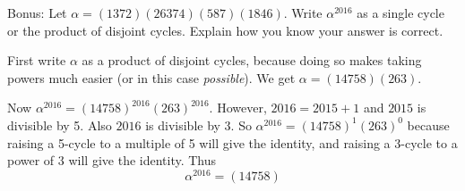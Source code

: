 \documentclass[11pt]{exam}
\begin{document}
\begin{questions}
\bonusquestion[5] Bonus: Let $\alpha = (1372)(26374)(587)(1846)$.  Write $\alpha^{2016}$ as a single cycle or the product of disjoint cycles. Explain how you know your answer is correct.
\begin{solution}
 First write $\alpha$ as a product of disjoint cycles, because doing so makes taking powers much easier (or in this case {\em possible}).  We get $\alpha = (14758)(263)$.  
 
 Now $\alpha^{2016} = (14758)^{2016}(263)^{2016}$.  However, $2016 = 2015 + 1$ and $2015$ is divisible by 5.  Also $2016$ is divisible by 3.  So $\alpha^{2016} = (14758)^1(263)^0$ because raising a 5-cycle to a multiple of 5 will give the identity, and raising a 3-cycle to a power of 3 will give the identity.  Thus
 \[\alpha^{2016} = (14758)\]
\end{solution}

\vfill
\end{questions}
\end{document}
